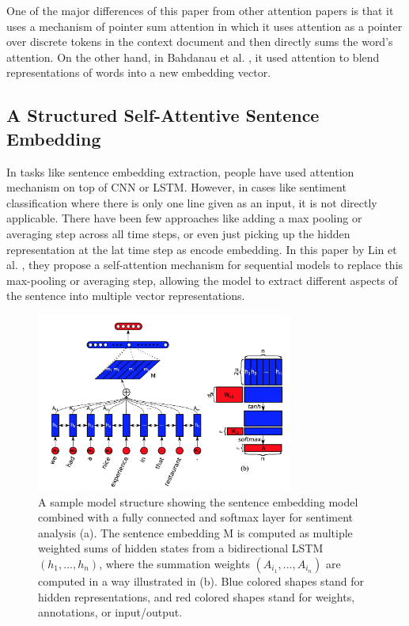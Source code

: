 \documentclass{article}
\begin{document}
	One of the major differences of this paper from other attention papers is that it uses a mechanism of pointer sum attention in which it uses attention as a pointer over discrete tokens in the context document and then directly sums the word's attention. On the other hand, in Bahdanau et al. \cite{bahattn}, it used attention to blend representations of words into a new embedding vector. 
	
\subsection{A Structured Self-Attentive Sentence Embedding}
\label{sec:lin}

	In tasks like sentence embedding extraction, people have used attention mechanism on top of CNN or LSTM. However, in cases like sentiment classification where there is only one line given as an input, it is not directly applicable. There have been few approaches like adding a max pooling or averaging step across all time steps, or even just picking up the hidden representation at the lat time step as encode embedding. In this paper by Lin et al. \cite{lin}, they propose a self-attention mechanism for sequential models to replace this max-pooling or averaging step, allowing the model to extract different aspects of the sentence into multiple vector representations. 
	
	\begin{figure}
		\centering
		\includegraphics[width=0.75\textwidth]{fig/selfatnemb.png}
		\caption{ A sample model structure showing the sentence embedding model combined with a fully
			connected and softmax layer for sentiment analysis (a). The sentence embedding M is computed as
			multiple weighted sums of hidden states from a bidirectional LSTM \((h_1, ..., h_n)\), where the summation weights \((A_{i_1}, ..., A_{i_n})\) are computed in a way illustrated in (b). Blue colored shapes stand for hidden representations, and red colored shapes stand for weights, annotations, or input/output.}
		\label{fig:attnsum}
	\end{figure}
	
\end{document}
